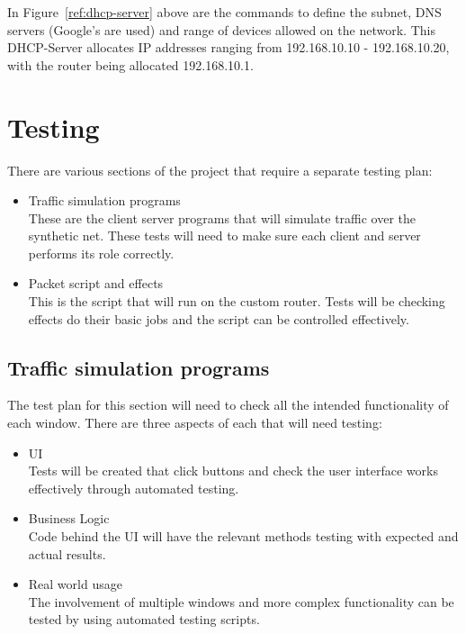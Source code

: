 In Figure~\ref{ref:dhcp-server} above are the commands to define the subnet, DNS servers (Google's are used) and range of devices allowed on the network. This DHCP-Server allocates IP addresses ranging from 192.168.10.10 - 192.168.10.20, with the router being allocated 192.168.10.1.


\section{Testing}
There are various sections of the project that require a separate testing plan:

\begin{itemize}

	\item Traffic simulation programs\\
	These are the client server programs that will simulate traffic over the synthetic net. These tests will need to 	make sure each client and server performs its role correctly.
	
	\item Packet script and effects\\
	This is the script that will run on the custom router. Tests will be checking effects do their basic jobs and the script can be controlled effectively.
	
\end{itemize}

\subsection{Traffic simulation programs}
The test plan for this section will need to check all the intended functionality of each window. There are three aspects of each that will need testing:

\begin{itemize}

	\item UI \\
	Tests will be created that click buttons and check the user interface works effectively through automated testing.

	\item Business Logic \\
	Code behind the UI will have the relevant methods testing with expected and actual results.

	\item Real world usage \\
	The involvement of multiple windows and more complex functionality can be tested by using automated testing 			scripts.
	
\end{itemize}

